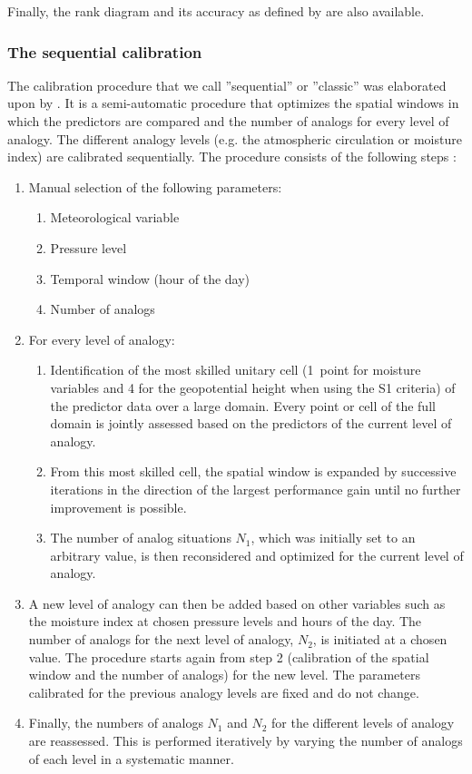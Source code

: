 \documentclass[review]{elsarticle}
\begin{document}
Finally, the rank diagram \citep{Talagrand1997} and its accuracy as defined by \citet{Candille2005} are also available.


\subsubsection{The sequential calibration}
\label{sec:sequential}

The calibration procedure that we call ''sequential'' or ''classic'' was elaborated upon by \citet{Bontron2004} \cite[see also][]{Radanovics2013, BenDaoud2016}. It is a semi-automatic procedure that optimizes the spatial windows in which the predictors are compared and the number of analogs for every level of analogy. The different analogy levels (e.g. the atmospheric circulation or moisture index) are calibrated sequentially. The procedure consists of the following steps \citep{Bontron2004}:

\begin{enumerate}
	\item Manual selection of the following parameters:
	\begin{enumerate}
		\item Meteorological variable
		\item Pressure level
		\item Temporal window (hour of the day)
		\item Number of analogs 
	\end{enumerate}
	
	\item For every level of analogy:
	\begin{enumerate}
		\item Identification of the most skilled unitary cell (1~point for moisture variables and 4 for the geopotential height when using the S1 criteria) of the predictor data over a large domain. Every point or cell of the full domain is jointly assessed based on the predictors of the current level of analogy.
		\item From this most skilled cell, the spatial window is expanded by successive iterations in the direction of the largest performance gain until no further improvement is possible.
		\item The number of analog situations $N_{1}$, which was initially set to an arbitrary value, is then reconsidered and optimized for the current level of analogy.
	\end{enumerate}
	\item A new level of analogy can then be added based on other variables such as the moisture index at chosen pressure levels and hours of the day. The number of analogs for the next level of analogy, $N_{2}$, is initiated at a chosen value. The procedure starts again from step 2 (calibration of the spatial window and the number of analogs) for the new level. The parameters calibrated for the previous analogy levels are fixed and do not change.
	\item Finally, the numbers of analogs $N_{1}$ and $N_{2}$ for the different levels of analogy are reassessed. This is performed iteratively by varying the number of analogs of each level in a systematic manner. 
\end{enumerate}
\end{document}
